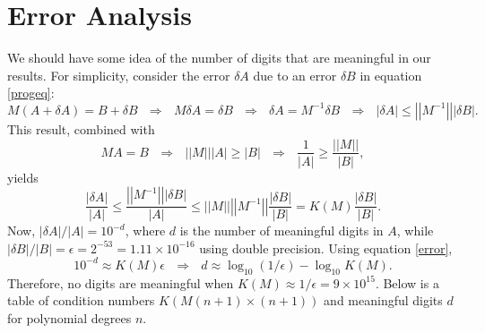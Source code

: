 \documentclass[10pt]{article}
\begin{document}
\section{Error Analysis}
\noindent We should have some idea of the number of digits that are meaningful in our results. For simplicity, consider the error $\delta A$ due to an error $\delta B$ in equation \ref{progeq}:
\begin{equation*}
M\left(A+\delta A\right) = B + \delta B \ \ \ \Rightarrow \ \ \ M \delta A = \delta B \ \ \ \Rightarrow \ \ \ \delta A = M^{-1} \delta B \ \ \ \Rightarrow \ \ \ \left| \delta A \right| \le \left| \left| M^{-1} \right| \right| \left| \delta B \right|.
\end{equation*}
\noindent This result, combined with
\begin{equation*}
M A = B \ \ \ \Rightarrow \ \ \ \left| \left| M \right| \right|  \left| A \right| \ge \left|  B \right| \ \ \ \Rightarrow \ \ \ \frac{1}{\left| A \right|} \ge \frac{\left| \left| M \right| \right|}{\left| B \right|},
\end{equation*}
\noindent yields
\begin{equation}\label{error}
\frac{ \left| \delta A  \right| }{\left| A \right|} \le \frac{\left| \left| M^{-1} \right| \right| \left| \delta B  \right|}{\left|A\right|} \le \left| \left| M \right| \right| \left| \left| M^{-1} \right| \right| \frac{ \left| \delta B \right| }{\left| B \right|} = K\left(M\right) \frac{ \left| \delta B \right| }{\left| B \right|}.
\end{equation}
\noindent Now, $\left| \delta A \right| / \left| A \right| = 10^{-d}$, where $d$ is the number of meaningful digits in $A$, while $\left| \delta B \right| / \left| B \right| =\epsilon = 2^{-53} = 1.11 \times 10^{-16}$ using double precision. Using equation \ref{error},
\begin{equation*}
10^{-d} \approx K\left(M\right) \epsilon \ \ \ \Rightarrow \ \ \ d \approx \log_{10} \left(1/\epsilon\right) - \log_{10} K\left(M\right).
\end{equation*}
\noindent Therefore, no digits are meaningful when $K\left(M\right) \approx 1/\epsilon = 9 \times 10^{15}$. Below is a table of condition numbers $K\left(M\left(n+1\right) \times \left(n+1\right)\right)$ and meaningful digits $d$ for polynomial degrees $n$. \\
\end{document}
